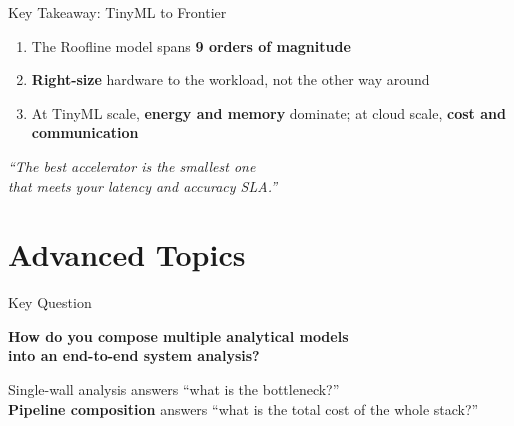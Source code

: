 \documentclass[aspectratio=169, 12pt]{beamer}
\begin{document}
\begin{frame}{Key Takeaway: TinyML to Frontier}
\begin{center}
\Large
\begin{enumerate}
  \item The Roofline model spans \textbf{9 orders of magnitude}
  \item \textbf{Right-size} hardware to the workload, not the other way around
  \item At TinyML scale, \textbf{energy and memory} dominate; at cloud scale, \textbf{cost and communication}
\end{enumerate}

\vspace{1em}
\normalsize
\textit{``The best accelerator is the smallest one\\
that meets your latency and accuracy SLA.''}
\end{center}
\end{frame}


\section{Advanced Topics}

\begin{frame}{Key Question}
\begin{center}
\Large\bfseries
How do you compose multiple analytical models\\[4pt]
into an end-to-end system analysis?
\end{center}
\vfill
\small
Single-wall analysis answers ``what is the bottleneck?''\\
\textbf{Pipeline composition} answers ``what is the total cost of the whole stack?''
\end{frame}
\end{document}
